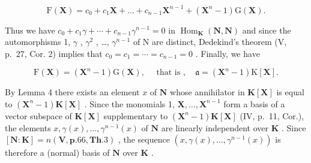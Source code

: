 \[
\mathrm{F} (\mathbf {X}) = c _ {0} + c _ {1} \mathbf {X} + \dots + c _ {n - 1} \mathbf {X} ^ {n - 1} + (\mathbf {X} ^ {n} - 1) \mathrm{G} (\mathbf {X}).\tag{11}
\]

Thus we have \(c_{0} + c_{1}\gamma + \cdots + c_{n-1}\gamma^{n-1} = 0\) in \(\operatorname{Hom}_{\mathbf{K}}(\mathbf{N}, \mathbf{N})\) and since the automorphisms 1, \(\gamma\) , \(\gamma^{2}\) , \ldots, \(\gamma^{n-1}\) of N are distinct, Dedekind's theorem (V, p.~27, Cor. 2) implies that \(c_{0} = c_{1} = \cdots = c_{n-1} = 0\) . Finally, we have

\[
\mathrm{F} (\mathbf {X}) = \left(\mathbf {X} ^ {n} - 1\right) \mathrm{G} (\mathbf {X}), \quad \text { that   is }, \quad \mathfrak {a} = \left(\mathbf {X} ^ {n} - 1\right) \mathrm{K} [ \mathbf {X} ].
\]

By Lemma 4 there exists an element \(x\) of \(\mathbf{N}\) whose annihilator in \(\mathbf{K}[\mathbf{X}]\) is equal to \((\mathbf{X}^n - 1)\mathbf{K}[\mathbf{X}]\) . Since the monomials 1, \(\mathbf{X}, \ldots, \mathbf{X}^{n-1}\) form a basis of a vector subspace of \(\mathbf{K}[\mathbf{X}]\) supplementary to \((\mathbf{X}^n - 1)\mathbf{K}[\mathbf{X}]\) (IV, p.~11, Cor.), the elements \(x, \gamma(x), \ldots, \gamma^{n-1}(x)\) of \(\mathbf{N}\) are linearly independent over \(\mathbf{K}\) . Since \([\mathbf{N}:\mathbf{K}] = n(\mathbf{V},\mathbf{p}.66,\mathbf{Th}.3)\) , the sequence \((x,\gamma(x),\ldots,\gamma^{n-1}(x))\) is therefore a (normal) basis of \(\mathbf{N}\) over \(\mathbf{K}\) .

